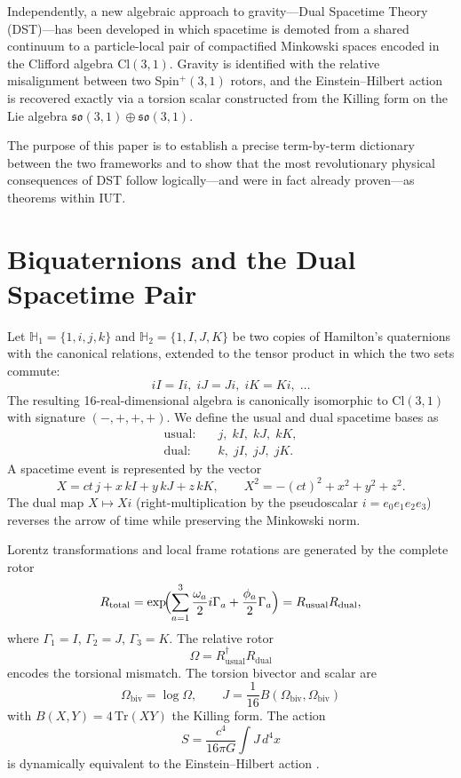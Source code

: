 \documentclass[dvipdfmx,11pt,a4paper]{article}
\begin{document}
Independently, a new algebraic approach to gravity—Dual Spacetime Theory (DST)—has been developed \cite{DSTdraft} in which spacetime is demoted from a shared continuum to a particle-local pair of compactified Minkowski spaces encoded in the Clifford algebra $\mathrm{Cl}(3,1)$. Gravity is identified with the relative misalignment between two Spin$^+(3,1)$ rotors, and the Einstein–Hilbert action is recovered exactly via a torsion scalar constructed from the Killing form on the Lie algebra $\mathfrak{so}(3,1)\oplus\mathfrak{so}(3,1)$.

The purpose of this paper is to establish a precise term-by-term dictionary between the two frameworks and to show that the most revolutionary physical consequences of DST follow logically—and were in fact already proven—as theorems within IUT.

\section{Biquaternions and the Dual Spacetime Pair}

Let $\mathbb{H}_1=\{1,i,j,k\}$ and $\mathbb{H}_2=\{1,I,J,K\}$ be two copies of Hamilton’s quaternions with the canonical relations, extended to the tensor product in which the two sets commute:
\[
iI=Ii,\;iJ=Ji,\;iK=Ki,\;\dots
\]
The resulting 16-real-dimensional algebra is canonically isomorphic to $\mathrm{Cl}(3,1)$ with signature $(-,+,+,+)$. We define the usual and dual spacetime bases as
\begin{align*}
\text{usual:}\quad &j,\;kI,\;kJ,\;kK,\\
\text{dual:}\quad &k,\;jI,\;jJ,\;jK.
\end{align*}
A spacetime event is represented by the vector
\[
X=ct\,j+x\,kI+y\,kJ+z\,kK,
\qquad
X^2=-(ct)^2+x^2+y^2+z^2.
\]
The dual map $X\mapsto Xi$ (right-multiplication by the pseudoscalar $i=e_0e_1e_2e_3$) reverses the arrow of time while preserving the Minkowski norm.

Lorentz transformations and local frame rotations are generated by the complete rotor
\[
R_{\text{total}}=\exp\!\Bigl(\sum_{a=1}^3\frac{\omega_a}{2}i\Gamma_a+\frac{\phi_a}{2}\Gamma_a\Bigr)
=R_{\text{usual}}R_{\text{dual}},
\]
where $\Gamma_1=I$, $\Gamma_2=J$, $\Gamma_3=K$. The relative rotor
\[
\Omega=R_{\text{usual}}^\dagger R_{\text{dual}}
\]
encodes the torsional mismatch. The torsion bivector and scalar are
\[
\Omega_{\text{biv}}=\log\Omega,\qquad
J=\frac{1}{16}B(\Omega_{\text{biv}},\Omega_{\text{biv}})
\]
with $B(X,Y)=4\,\mathrm{Tr}(XY)$ the Killing form. The action
\[
S=\frac{c^4}{16\pi G}\int J\,d^4x
\]
is dynamically equivalent to the Einstein–Hilbert action \cite{DSTdraft}.
\end{document}
